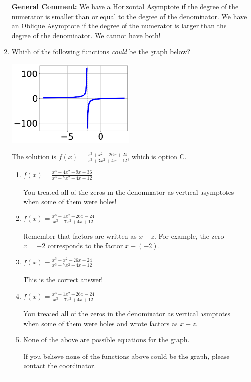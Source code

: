 \documentclass{extbook}[14pt]
\newcommand{\litem}[1]{\item #1

\rule{\textwidth}{0.4pt}}
\begin{document}
\begin{enumerate}
{\textbf{General Comment:} We have a Horizontal Asymptote if the degree of the numerator is smaller than or equal to the degree of the denominator. We have an Oblique Asymptote if the degree of the numerator is larger than the degree of the denominator. We cannot have both!
}
\litem{
Which of the following functions \textit{could} be the graph below?

\begin{center}
    \includegraphics[width=0.5\textwidth]{../Figures/identifyGraphOfRationalFunctionCopyB.png}
\end{center}




The solution is \( f(x)=\frac{x^{3} + x^{2} -26 x + 24}{x^{3} +7 x^{2} +4 x -12} \), which is option C.\begin{enumerate}[label=\Alph*.]
\item \( f(x)=\frac{x^{3} -4 x^{2} -9 x + 36}{x^{3} +7 x^{2} +4 x -12} \)

You treated all of the zeros in the denominator as vertical asymptotes when some of them were holes!
\item \( f(x)=\frac{x^{3} -1 x^{2} -26 x -24}{x^{3} -7 x^{2} +4 x + 12} \)

Remember that factors are written as $x-z$. For example, the zero $x=-2$ corresponds to the factor $x-(-2)$.
\item \( f(x)=\frac{x^{3} + x^{2} -26 x + 24}{x^{3} +7 x^{2} +4 x -12} \)

This is the correct answer!
\item \( f(x)=\frac{x^{3} -1 x^{2} -26 x -24}{x^{3} -7 x^{2} +4 x + 12} \)

You treated all of the zeros in the denominator as vertical asmptotes when some of them were holes and wrote factors as $x+z$.
\item \( \text{None of the above are possible equations for the graph.} \)

If you believe none of the functions above could be the graph, please contact the coordinator.
\end{enumerate}

}
\end{enumerate}
\end{document}
